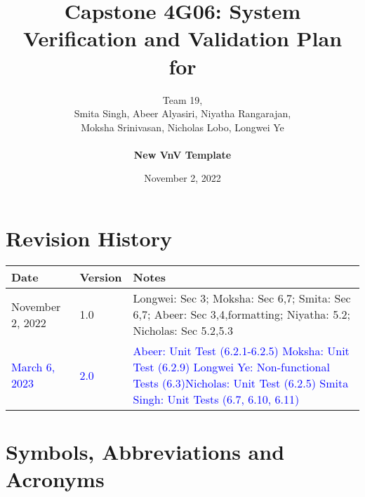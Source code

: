 \documentclass[12pt, titlepage]{article}
\begin{document}
\title{Capstone 4G06: System Verification and Validation Plan for } 
\author{Team 19,
		\\ Smita Singh, Abeer Alyasiri, Niyatha Rangarajan,\\ Moksha Srinivasan, Nicholas Lobo, Longwei Ye \\\\
		\textbf{New VnV Template}
}

\date{November 2, 2022}
	
\maketitle


\section{Revision History}

\begin{tabularx}{\textwidth}{p{3cm}p{2cm}X}
\toprule {\bf Date} & {\bf Version} & {\bf Notes}\\
\midrule
November 2, 2022 & 1.0 & Longwei: Sec 3; Moksha: Sec 6,7; Smita: Sec 6,7; Abeer: Sec 3,4,formatting; Niyatha: 5.2; Nicholas: Sec 5.2,5.3 \\
\textcolor{blue}{March 6, 2023} & \textcolor{blue}{2.0} & \textcolor{blue}{Abeer: Unit Test (6.2.1-6.2.5)} \textcolor{blue}{Moksha: Unit Test (6.2.9)} \textcolor{blue}{Longwei Ye: Non-functional Tests (6.3)}\textcolor{blue}{Nicholas: Unit Test (6.2.5)} \textcolor{blue}{Smita  Singh: Unit Tests (6.7, 6.10, 6.11)} \\
\bottomrule
\end{tabularx}

\newpage

\tableofcontents

\listoftables


\newpage

\section{Symbols, Abbreviations and Acronyms}
\end{document}
